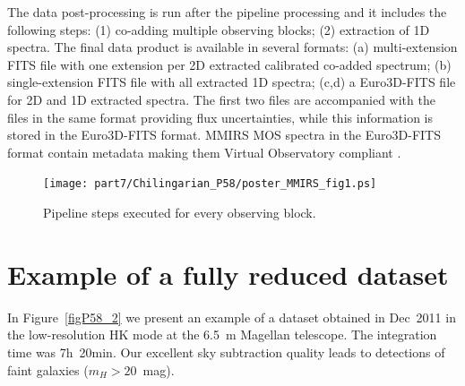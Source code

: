 The data post-processing is run after the pipeline processing and it includes the following steps: (1) co-adding multiple observing blocks; (2) extraction of 1D spectra.  The final data product is available in several formats: (a) multi-extension FITS file with one extension per 2D extracted calibrated co-added spectrum; (b) single-extension FITS file with all extracted 1D spectra; (c,d) a Euro3D-FITS file for 2D and 1D extracted spectra.  The first two files are accompanied with the files in the same format providing flux uncertainties, while this information is stored in the Euro3D-FITS format.  MMIRS MOS spectra in the Euro3D-FITS format contain metadata making them Virtual Observatory compliant \citep{CBLM06,Chilingarian+08b}.

\begin{figure}
\texttt{[image: part7/Chilingarian\_P58/poster\_MMIRS\_fig1.ps]}
\caption{Pipeline steps executed for every observing block.\label{figP58_1}}
\end{figure}

\section{Example of a fully reduced dataset}

In Figure~\ref{figP58_2} we present an example of a dataset obtained in Dec~2011 in the low-resolution HK mode at the 6.5~m Magellan telescope. The integration time was 7h~20min. Our excellent sky subtraction quality leads to detections of faint galaxies ($m_H>20$~mag).


